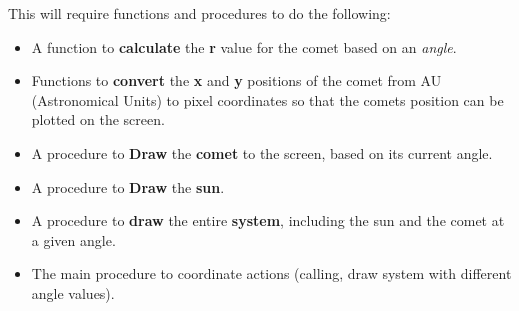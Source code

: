 This will require functions and procedures to do the following:
\begin{itemize}
  \item A function to \textbf{calculate} the \textbf{r} value for the comet based on an \emph{angle}.
  \item Functions to \textbf{convert} the \textbf{x} and \textbf{y} positions of the comet from AU (Astronomical Units) to pixel coordinates so that the comets position can be plotted on the screen.
  \item A procedure to \textbf{Draw} the \textbf{comet} to the screen, based on its current angle.
  \item A procedure to \textbf{Draw} the \textbf{sun}.
  \item A procedure to \textbf{draw} the entire \textbf{system}, including the sun and the comet at a given angle.
  \item The main procedure to coordinate actions (calling, draw system with different angle values).
\end{itemize}

\clearpage


\begin{figure}[p]
\end{figure}

\begin{figure}[p]
\end{figure}



